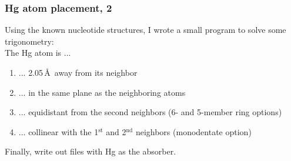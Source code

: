 \documentclass[10pt, xcolor=x11names, compress]{beamer}
\begin{document}
\begin{frame}
  \frametitle{Hg atom placement, 2}
  Using the known nucleotide structures, I wrote a small program to
  solve some trigonometry:\\[2ex]

  The Hg atom is ...
  \begin{enumerate}
  \item ... 2.05\,\AA\ away from its neighbor 
  \item ... in the same plane as the neighboring atoms
  \item ... equidistant from the second neighbors (6- and
    5-member ring options)
  \item ... collinear with the 1$^{\mathrm{st}}$ and
    2$^{\mathrm{nd}}$ neighbors (monodentate option)
  \end{enumerate}

  \bigskip

  Finally, write out  files with Hg as the absorber.
\end{frame}
\end{document}
